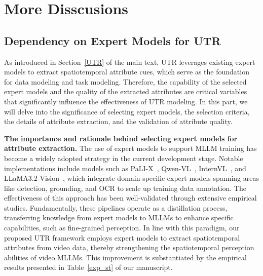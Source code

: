 \section{More Disscusions}
\label{add_disscusion}

\subsection{Dependency on Expert Models for UTR}
\label{add_utr}

As introduced in Section~\ref{UTR} of the main text, UTR leverages existing expert models to extract spatiotemporal attribute cues, which serve as the foundation for data modeling and task modeling. Therefore, the capability of the selected expert models and the quality of the extracted attributes are critical variables that significantly influence the effectiveness of UTR modeling. In this part, we will delve into the significance of selecting expert models, the selection criteria, the details of attribute extraction, and the validation of attribute quality.

\textbf{The importance and rationale behind selecting expert models for attribute extraction.} The use of expert models to support MLLM training has become a widely adopted strategy in the current development stage. Notable implementations include models such as PaLI-X~\citep{chen2023pali}, Qwen-VL~\citep{qwen}, InternVL~\citep{chen2024internvl}, and LLaMA3.2-Vision~\citep{llama3.2}, which integrate domain-specific expert models spanning areas like detection, grounding, and OCR to scale up training data annotation. The effectiveness of this approach has been well-validated through extensive empirical studies. Fundamentally, these pipelines operate as a distillation process, transferring knowledge from expert models to MLLMs to enhance specific capabilities, such as fine-grained perception. In line with this paradigm, our proposed UTR framework employs expert models to extract spatiotemporal attributes from video data, thereby strengthening the spatiotemporal perception abilities of video MLLMs. This improvement is substantiated by the empirical results presented in Table~\ref{exp_st} of our manuscript.

